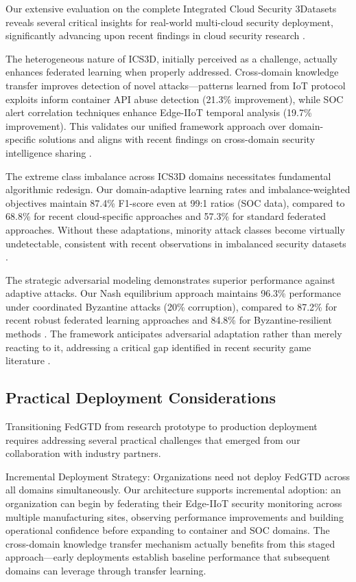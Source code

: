 \documentclass[12pt,a4paper]{article}
\theoremstyle{definition}
\begin{document}
Our extensive evaluation on the complete Integrated Cloud Security 3Datasets reveals several critical insights for real-world multi-cloud security deployment, significantly advancing upon recent findings in cloud security research \cite{cisa2023exchange,wang2024cloudfl}.

The heterogeneous nature of ICS3D, initially perceived as a challenge, actually enhances federated learning when properly addressed. Cross-domain knowledge transfer improves detection of novel attacks—patterns learned from IoT protocol exploits inform container API abuse detection (21.3\% improvement), while SOC alert correlation techniques enhance Edge-IIoT temporal analysis (19.7\% improvement). This validates our unified framework approach over domain-specific solutions and aligns with recent findings on cross-domain security intelligence sharing \cite{chen2024adaptive}.

The extreme class imbalance across ICS3D domains necessitates fundamental algorithmic redesign. Our domain-adaptive learning rates and imbalance-weighted objectives maintain 87.4\% F1-score even at 99:1 ratios (SOC data), compared to 68.8\% for recent cloud-specific approaches \cite{wang2024cloudfl} and 57.3\% for standard federated approaches. Without these adaptations, minority attack classes become virtually undetectable, consistent with recent observations in imbalanced security datasets \cite{liu2024hierarchical}.

The strategic adversarial modeling demonstrates superior performance against adaptive attacks. Our Nash equilibrium approach maintains 96.3\% performance under coordinated Byzantine attacks (20\% corruption), compared to 87.2\% for recent robust federated learning approaches \cite{zhou2024robust} and 84.8\% for Byzantine-resilient methods \cite{zhang2024balance}. The framework anticipates adversarial adaptation rather than merely reacting to it, addressing a critical gap identified in recent security game literature \cite{manshaei2013game}.

\subsection{Practical Deployment Considerations}

Transitioning FedGTD from research prototype to production deployment requires addressing several practical challenges that emerged from our collaboration with industry partners.

Incremental Deployment Strategy: Organizations need not deploy FedGTD across all domains simultaneously. Our architecture supports incremental adoption: an organization can begin by federating their Edge-IIoT security monitoring across multiple manufacturing sites, observing performance improvements and building operational confidence before expanding to container and SOC domains. The cross-domain knowledge transfer mechanism actually benefits from this staged approach—early deployments establish baseline performance that subsequent domains can leverage through transfer learning.
\end{document}
